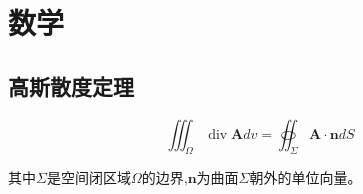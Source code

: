 \section{数学}

\subsection{高斯散度定理}

\begin{equation*}
    \iiint_{\Omega} \operatorname{div} \mathbf{A} d v=\oiint_{\Sigma} \mathbf{A} \cdot \mathbf{n} d S
\end{equation*}

其中$\Sigma$是空间闭区域$\Omega$的边界,$\mathbf{n}$为曲面$\Sigma$朝外的单位向量。